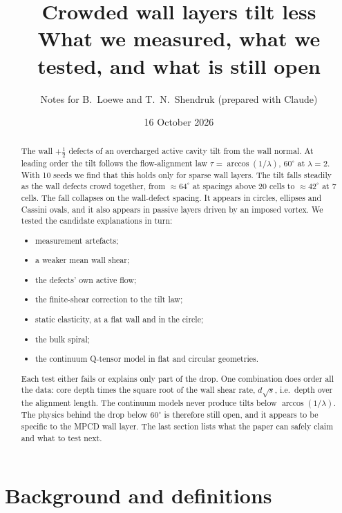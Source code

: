 \documentclass[11pt,a4paper]{article}
\title{Crowded wall layers tilt less\\[2pt]\large What we measured, what we tested, and what is still open}
\author{Notes for B.~Loewe and T.~N.~Shendruk (prepared with Claude)}
\date{16 October 2026}
\newcommand{\half}{\tfrac12}
\begin{document}
\maketitle

\begin{abstract}
The wall $+\half$ defects of an overcharged active cavity tilt from the wall normal. At leading order the tilt follows the flow-alignment law $\tau=\arccos(1/\lambda)$, $60^\circ$ at $\lambda=2$. With 10 seeds we find that this holds only for sparse wall layers. The tilt falls steadily as the wall defects crowd together, from $\approx64^\circ$ at spacings above 20 cells to $\approx42^\circ$ at 7 cells. The fall collapses on the wall-defect spacing. It appears in circles, ellipses and Cassini ovals, and it also appears in passive layers driven by an imposed vortex. We tested the candidate explanations in turn:
\begin{itemize}
\item measurement artefacts;
\item a weaker mean wall shear;
\item the defects' own active flow;
\item the finite-shear correction to the tilt law;
\item static elasticity, at a flat wall and in the circle;
\item the bulk spiral;
\item the continuum Q-tensor model in flat and circular geometries.
\end{itemize}
Each test either fails or explains only part of the drop. One combination does order all the data: core depth times the square root of the wall shear rate, $d\sqrt{s}$, i.e.\ depth over the alignment length. The continuum models never produce tilts below $\arccos(1/\lambda)$. The physics behind the drop below $60^\circ$ is therefore still open, and it appears to be specific to the MPCD wall layer. The last section lists what the paper can safely claim and what to test next.
\end{abstract}

\section{Background and definitions}
\end{document}
